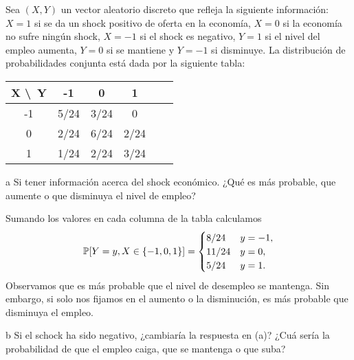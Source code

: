 \begin{statement}{3}
  Sea $(X, Y)$ un vector aleatorio discreto que refleja la siguiente informaci\'on:
  $X = 1$ si se da un shock positivo de oferta en la econom\'ia,
  $X = 0$ si la econom\'ia no sufre ning\'un shock,
  $X = -1$ si el shock es negativo,
  $Y = 1$ si el nivel del empleo aumenta,
  $Y = 0$ si se mantiene y
  $Y = -1$ si disminuye.
  La distribuci\'on de probabilidades conjunta est\'a dada por la siguiente tabla:
  \begin{center}
    \begin{tabular}{ | c | c | c | c | c | c | }
      \hline
      X \textbackslash \, Y & -1 & 0 & 1 \\ \hline
      -1 & 5/24 & 3/24 & 0 \\ \hline
      0 & 2/24 & 6/24 & 2/24 \\ \hline
      1 & 1/24 & 2/24 & 3/24 \\
      \hline
    \end{tabular}
  \end{center}
\end{statement}

\begin{statement}{a}
  Si tener informaci\'on acerca del shock econ\'omico.
  ¿Qu\'e es m\'as probable, que aumente o que disminuya el nivel de empleo?
\end{statement}

\begin{solution}
  Sumando los valores en cada columna de la tabla calculamos
  \[
    \mathbb{P}[Y = y, X \in \{-1, 0, 1\}] = \begin{cases}
      8/24 & y = -1, \\
      11/24 & y = 0, \\
      5/24 & y = 1.
    \end{cases}
  \]
  Observamos que es m\'as probable que el nivel de desempleo se mantenga.
  Sin embargo, si solo nos fijamos en el aumento o la disminuci\'on, es m\'as probable que disminuya el empleo.
\end{solution}

\begin{statement}{b}
  Si el schock ha sido negativo, ¿cambiar\'ia la respuesta en (a)?
  ¿Cu\'a ser\'ia la probabilidad de que el empleo caiga, que se mantenga o que suba?
\end{statement}

